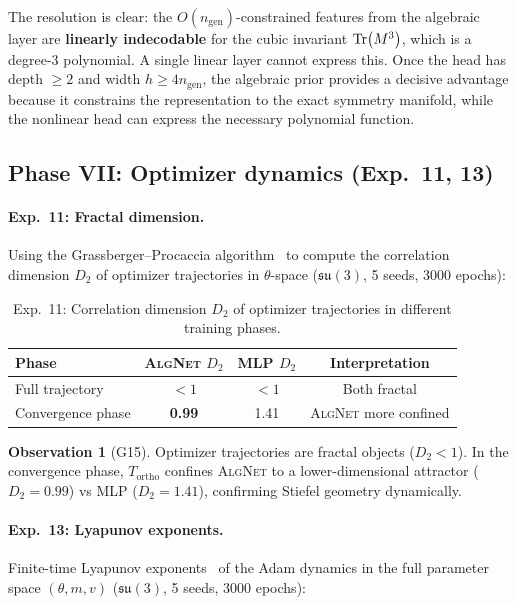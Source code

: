 \documentclass[11pt,a4paper]{article}
\newcommand{\fksu}{\mathfrak{su}}
\newcommand{\Tortho}{T_{\mathrm{ortho}}}
\newcommand{\ngen}{n_{\mathrm{gen}}}
\newcommand{\AlgNet}{\textsc{AlgNet}}
\theoremstyle{definition}
\newtheorem{observation}{Observation}
\begin{document}
The resolution is clear: the $O(\ngen)$-constrained features from the 
algebraic layer are \textbf{linearly indecodable} for the cubic invariant 
$\Tr(M^3)$, which is a degree-3 polynomial. A single linear layer 
cannot express this. Once the head has depth $\geq 2$ and width 
$h \geq 4\ngen$, the algebraic prior provides a decisive advantage 
because it constrains the representation to the exact symmetry manifold, 
while the nonlinear head can express the necessary polynomial function.


\subsection{Phase VII: Optimizer dynamics (Exp.~11, 13)}
\label{sec:phase7}

\paragraph{Exp.~11: Fractal dimension.}
Using the Grassberger--Procaccia algorithm~\cite{grassberger1983} to 
compute the correlation dimension $D_2$ of optimizer trajectories in 
$\theta$-space ($\fksu(3)$, 5 seeds, 3000 epochs):

\begin{table}[H]
\centering
\caption{Exp.~11: Correlation dimension $D_2$ of optimizer 
trajectories in different training phases.}
\label{tab:exp11}
\begin{tabular}{lccc}
\toprule
Phase & \AlgNet{} $D_2$ & MLP $D_2$ & Interpretation \\
\midrule
Full trajectory   & $< 1$ & $< 1$ & Both fractal \\
Convergence phase & \textbf{0.99} & 1.41  & \AlgNet{} more confined \\
\bottomrule
\end{tabular}
\end{table}

\begin{observation}[G15]
Optimizer trajectories are fractal objects ($D_2 < 1$). In the 
convergence phase, $\Tortho$ confines \AlgNet{} to a 
lower-dimensional attractor ($D_2 = 0.99$) vs MLP ($D_2 = 1.41$), 
confirming Stiefel geometry dynamically.
\end{observation}

\paragraph{Exp.~13: Lyapunov exponents.}
Finite-time Lyapunov exponents~\cite{wolf1985determining} of the Adam 
dynamics in the full parameter space $(\theta, m, v)$ 
($\fksu(3)$, 5 seeds, 3000 epochs):
\end{document}
